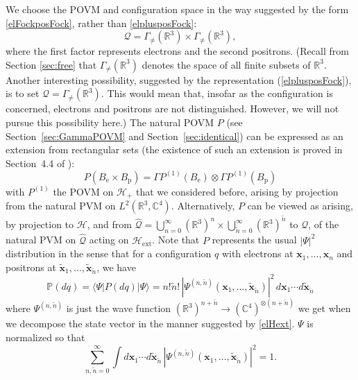 \documentclass[12pt]{article}
\newcommand{\CCC}{\mathbb{C}} %
\newcommand{\RRR}{\mathbb{R}} %
\newcommand{\1}{\mathbf{1}} %
\newcommand{\Hilbert}{\mathscr{H}}
\renewcommand{\sp}[2]{\langle #1 | #2 \rangle} %
\newcommand{\conf}{\mathcal{Q}} %
\newcommand{\measure}{\mathbb{P}} %
\newcommand{\pov}{{P}}%
\newcommand{\Gommo}{\Gamma_{\!\neq}} %
\newcommand{\vx}{{\boldsymbol x}} %
\newcommand{\pvx}{{\widetilde{\vx}}}
\newcommand{\pn}{{\widetilde{n}}}
\newcommand{\el}{\mathrm{e}} %
\newcommand{\pos}{\mathrm{p}} %
\newcommand{\ext}{{\mathrm{ext}}} %
\begin{document}
  We choose the POVM and configuration space in the way suggested by the
form \eqref{elFockposFock}, rather than \eqref{elplusposFock}:
\begin{equation}
   \conf = \Gommo(\RRR^3) \times \Gommo(\RRR^3),
\end{equation}
where the first factor represents electrons and the second
positrons. (Recall from Section \ref{sec:free} that
$\Gommo(\RRR^3)$ denotes the space of all finite subsets
of $\RRR^3$.  Another interesting possibility, suggested by the
representation (\ref{elplusposFock}), is to set $\conf =
\Gommo(\RRR^3)$. This would mean that, insofar as the
configuration is concerned, electrons and positrons are not
distinguished. However, we will not pursue this possibility here.)
The natural POVM $\pov$ (see Section~\ref{sec:GammaPOVM} and
Section~\ref{sec:identical}) can be expressed as an extension from
rectangular sets (the existence of such an extension is proved in
Section~4.4 of \cite{crea2A}):
\[
   \pov(B_\el \times B_\pos) = \Gamma\pov^{(1)}(B_\el) \otimes
   \Gamma\pov^{(1)}(B_\pos)
\]
with $\pov^{(1)}$ the POVM on $\Hilbert_+$ that we considered before,
arising by projection from the natural PVM on $L^2(\RRR^3,\CCC^4)$.
Alternatively, $\pov$ can be viewed as arising, by projection to
$\Hilbert$, and from $\hat{\conf} = \bigcup_{n=0}^\infty (\RRR^3)^n
\times \bigcup_{\pn=0}^\infty (\RRR^3)^\pn$ to $\conf$, of the natural
PVM on $\hat{\conf}$ acting on $\Hilbert_\ext$.  Note that $\pov$
represents the usual $|\Psi|^2$ distribution in the sense that for a
configuration $q$ with electrons at $\vx_1, \ldots, \vx_n$ and
positrons at $\pvx_1, \ldots, \pvx_\pn$, we have
\[
   \measure(dq) = \sp{\Psi}{\pov(dq)|\Psi} = n! \pn! \,
   |\Psi^{(n,\pn)}(\vx_1, \ldots, \pvx_\pn)|^2 \, d\vx_1 \cdots d\pvx_\pn
\]
where $\Psi^{(n,\pn)}$ is just the wave function $(\RRR^3)^{n+\pn}\to
(\CCC^4)^{\otimes (n+\pn)}$ we get when we decompose the state vector
in the manner suggested by \eqref{elHext}. $\Psi$ is normalized so
that
\[
   \sum_{n,\pn =0}^\infty \int d\vx_1 \cdots d\pvx_\pn \,
   |\Psi^{(n,\pn)}(\vx_1, \ldots, \pvx_\pn)|^2 = 1.
\]
\end{document}
